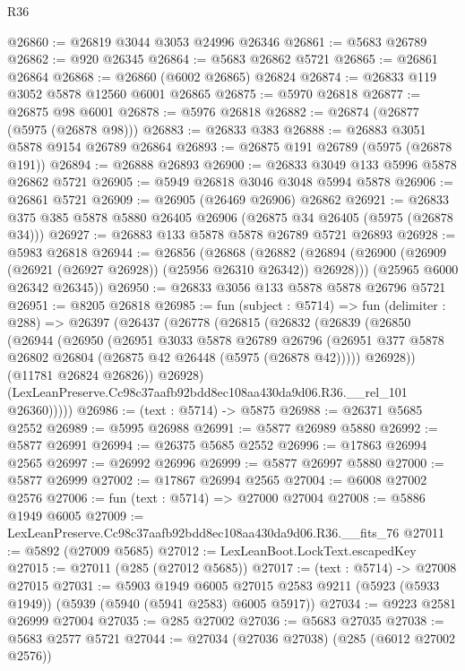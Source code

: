 \begin{lexlean}{R36}
\begin{coremodule}
@26860 := @26819 @3044 @3053 @24996 @26346
@26861 := @5683 @26789
@26862 := @920 @26345
@26864 := @5683 @26862 @5721
@26865 := @26861 @26864
@26868 := @26860 (@6002 @26865) @26824
@26874 := @26833 @119 @3052 @5878 @12560 @6001 @26865
@26875 := @5970 @26818
@26877 := @26875 @98 @6001
@26878 := @5976 @26818
@26882 := @26874 (@26877 (@5975 (@26878 @98)))
@26883 := @26833 @383
@26888 := @26883 @3051 @5878 @9154 @26789 @26864
@26893 := @26875 @191 @26789 (@5975 (@26878 @191))
@26894 := @26888 @26893
@26900 := @26833 @3049 @133 @5996 @5878 @26862 @5721
@26905 := @5949 @26818 @3046 @3048 @5994 @5878
@26906 := @26861 @5721
@26909 := @26905 (@26469 @26906) @26862
@26921 := @26833 @375 @385 @5878 @5880 @26405 @26906 (@26875 @34 @26405 (@5975 (@26878 @34)))
@26927 := @26883 @133 @5878 @5878 @26789 @5721 @26893
@26928 := @5983 @26818
@26944 := @26856
    (@26868
      (@26882 (@26894 (@26900 (@26909 (@26921 (@26927 @26928)) (@25956 @26310 @26342)) @26928)))
      (@25965 @6000 @26342 @26345))
@26950 := @26833 @3056 @133 @5878 @5878 @26796 @5721
@26951 := @8205 @26818
@26985 := fun (subject : @5714) =>
  fun (delimiter : @288) =>
  @26397
    (@26437
      (@26778
        (@26815
          (@26832
            (@26839
              (@26850
                (@26944
                  (@26950
                    (@26951
                      @3033
                      @5878
                      @26789
                      @26796
                      (@26951 @377 @5878 @26802 @26804 (@26875 @42 @26448 (@5975 (@26878 @42)))))
                    @26928))
                (@11781 @26824 @26826))
              @26928)
            (LexLeanPreserve.Cc98c37aafb92bdd8ec108aa430da9d06.R36.__rel_101 @26360)))))
@26986 := (text : @5714) -> @5875
@26988 := @26371 @5685 @2552
@26989 := @5995 @26988
@26991 := @5877 @26989 @5880
@26992 := @5877 @26991
@26994 := @26375 @5685 @2552
@26996 := @17863 @26994 @2565
@26997 := @26992 @26996
@26999 := @5877 @26997 @5880
@27000 := @5877 @26999
@27002 := @17867 @26994 @2565
@27004 := @6008 @27002 @2576
@27006 := fun (text : @5714) => @27000 @27004
@27008 := @5886 @1949 @6005
@27009 := LexLeanPreserve.Cc98c37aafb92bdd8ec108aa430da9d06.R36.__fits_76
@27011 := @5892 (@27009 @5685)
@27012 := LexLeanBoot.LockText.escapedKey
@27015 := @27011 (@285 (@27012 @5685))
@27017 := (text : @5714) -> @27008 @27015
@27031 := @5903
    @1949
    @6005
    @27015
    @2583
    @9211
    (@5923 (@5933 @1949))
    (@5939 (@5940 (@5941 @2583) @6005 @5917))
@27034 := @9223 @2581 @26999 @27004
@27035 := @285 @27002
@27036 := @5683 @27035
@27038 := @5683 @2577 @5721
@27044 := @27034 (@27036 @27038) (@285 (@6012 @27002 @2576))

\end{coremodule}
\end{lexlean}
